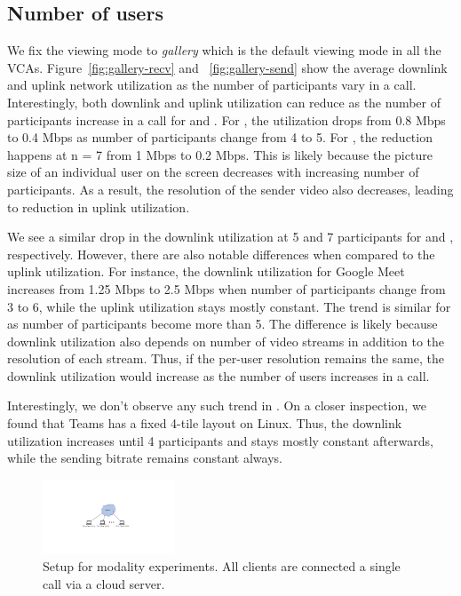 \subsection{Number of users}
We fix the viewing mode to \textit{gallery} which is the default viewing mode in all the VCAs. Figure~\ref{fig:gallery-recv} and~
\ref{fig:gallery-send} show the average downlink and uplink network utilization as the number of participants vary in a call. Interestingly, both downlink and uplink utilization can reduce as the number of participants increase in a call for \meet and \zoom. For \zoom, the utilization drops from 0.8 Mbps to 0.4 Mbps as number of participants change from 4 to 5. For \meet, the reduction happens at n = 7 from 1 Mbps to  0.2 Mbps. This is likely because the picture size of an individual user on the screen decreases with increasing number of participants. As a result, the resolution of the sender video also decreases, leading to reduction in uplink utilization. 


We see a similar drop in the downlink utilization at 5 and 7 participants for \zoom and \meet, respectively. However, there are also notable differences when compared to the uplink utilization. For instance, the downlink utilization for Google Meet increases from 1.25 Mbps to 2.5 Mbps when number of participants change from 3 to 6, while the uplink utilization stays mostly constant. The trend is similar for \zoom as number of participants become more than 5. The difference is likely because downlink utilization also depends on number of video streams in addition to the resolution of each stream. Thus, if the per-user resolution remains the same, the downlink utilization would increase as the number of users increases in a call.  

Interestingly, we don't observe any such trend in \teams. On a closer inspection, we found that Teams has a fixed 4-tile layout on Linux. Thus, the downlink utilization increases until 4 participants and stays mostly constant afterwards, while the sending bitrate remains constant always. 
 
\begin{figure}[h]
\centering
    \includegraphics[width=0.35\textwidth,keepaspectratio]{../figures/methodology/modality-setup.pdf}
    \caption{Setup for modality experiments. All clients are connected a single call via a cloud server.}
    \label{fig:modality-setup}
\end{figure}


